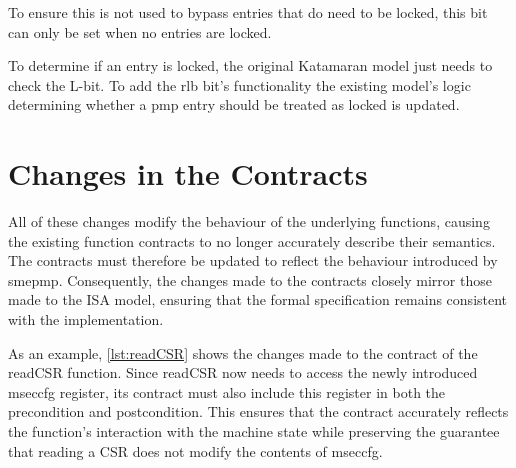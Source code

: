 To ensure this is not used to bypass entries that do need to be locked, this bit can only be set when no entries are locked.

To determine if an entry is locked, the original Katamaran model just needs to check the L-bit.
To add the \gls{rlb} bit's functionality the existing model's logic determining whether a \gls{pmp} entry should be treated as locked is updated.

\section{Changes in the Contracts}
All of these changes modify the behaviour of the underlying functions, causing the existing function contracts to no longer accurately describe their semantics. 
The contracts must therefore be updated to reflect the behaviour introduced by \gls{smepmp}.
Consequently, the changes made to the contracts closely mirror those made to the ISA model, ensuring that the formal specification remains consistent with the implementation.

As an example, \cref{lst:readCSR} shows the changes made to the contract of the readCSR function. 
Since readCSR now needs to access the newly introduced mseccfg register, its contract must also include this register in both the precondition and postcondition.
This ensures that the contract accurately reflects the function's interaction with the machine state while preserving the guarantee that reading a CSR does not modify the contents of mseccfg.

